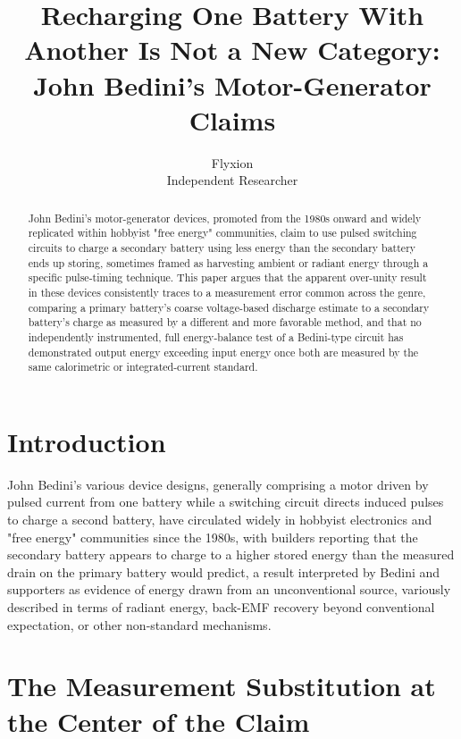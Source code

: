 \documentclass[11pt]{article}
\title{Recharging One Battery With Another Is Not a New Category: John Bedini's Motor-Generator Claims}
\author{Flyxion \\ \small Independent Researcher}
\date{}
\begin{document}
\maketitle

\begin{abstract}
John Bedini's motor-generator devices, promoted from the 1980s onward and widely replicated within hobbyist "free energy" communities, claim to use pulsed switching circuits to charge a secondary battery using less energy than the secondary battery ends up storing, sometimes framed as harvesting ambient or radiant energy through a specific pulse-timing technique. This paper argues that the apparent over-unity result in these devices consistently traces to a measurement error common across the genre, comparing a primary battery's coarse voltage-based discharge estimate to a secondary battery's charge as measured by a different and more favorable method, and that no independently instrumented, full energy-balance test of a Bedini-type circuit has demonstrated output energy exceeding input energy once both are measured by the same calorimetric or integrated-current standard.
\end{abstract}

\section{Introduction}

John Bedini's various device designs, generally comprising a motor driven by pulsed current from one battery while a switching circuit directs induced pulses to charge a second battery, have circulated widely in hobbyist electronics and "free energy" communities since the 1980s, with builders reporting that the secondary battery appears to charge to a higher stored energy than the measured drain on the primary battery would predict, a result interpreted by Bedini and supporters as evidence of energy drawn from an unconventional source, variously described in terms of radiant energy, back-EMF recovery beyond conventional expectation, or other non-standard mechanisms.

\section{The Measurement Substitution at the Center of the Claim}
\end{document}

